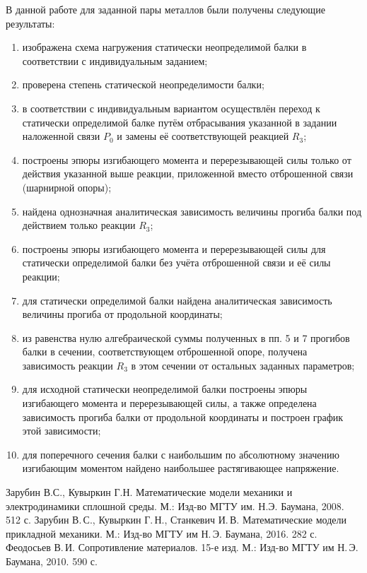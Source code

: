 \documentclass[12pt, a4paper]{article}
\begin{document}
	В данной работе для заданной пары металлов были получены следующие результаты:
	\begin{enumerate}
		\item изображена схема нагружения статически неопределимой балки в соответствии с индивидуальным заданием;
		
		\item проверена степень статической неопределимости балки;
		
		\item в соответствии с индивидуальным вариантом осуществлён переход к статически определимой балке путём отбрасывания указанной в задании наложенной связи $P_0$ и замены её соответствующей реакцией $R_3$; 
		
		\item построены эпюры изгибающего момента и перерезывающей силы только от действия указанной выше реакции, приложенной вместо отброшенной связи (шарнирной опоры);
		
		\item найдена однозначная аналитическая зависимость величины прогиба балки под действием только реакции $R_3$;
		
		\item построены эпюры изгибающего момента и перерезывающей силы для статически определимой балки без учёта отброшенной связи и её силы реакции;
		
		\item для статически определимой балки найдена аналитическая зависимость величины прогиба от продольной координаты;
		
		\item из равенства нулю алгебраической суммы полученных в пп. 5 и 7 прогибов балки в сечении, соответствующем отброшенной опоре, получена зависимость реакции $R_3$ в этом сечении от остальных заданных параметров;
		
		\item для исходной статически неопределимой балки построены эпюры изгибающего момента и перерезывающей силы, а также определена зависимость прогиба балки от продольной координаты и построен график этой зависимости;
		
		\item для поперечного сечения балки с наибольшим по абсолютному значению изгибающим моментом найдено наибольшее растягивающее напряжение.
		
	\end{enumerate}
	
	\newpage
	\begin{thebibliography}{2}
		 Зарубин В.С., Кувыркин Г.Н. Математические модели механики и электродинамики сплошной среды. М.: Изд-во МГТУ им. Н.Э. Баумана, 2008. 512 с.
		 Зарубин В.\,С., Кувыркин Г.\,Н., Станкевич И.\,В. Математические модели прикладной механики. М.: Изд-во МГТУ им Н.\,Э. Баумана, 2016. 282 с.
		 Феодосьев В.\,И. Сопротивление материалов. 15-е изд. М.: Изд-во МГТУ им Н.\,Э. Баумана, 2010. 590 с.
	\end{thebibliography}
	
\end{document}
